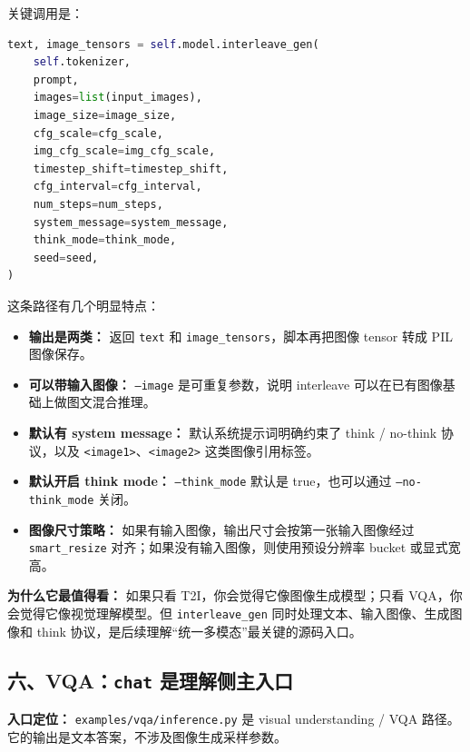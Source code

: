 关键调用是：

\begin{lstlisting}[language=Python]
text, image_tensors = self.model.interleave_gen(
    self.tokenizer,
    prompt,
    images=list(input_images),
    image_size=image_size,
    cfg_scale=cfg_scale,
    img_cfg_scale=img_cfg_scale,
    timestep_shift=timestep_shift,
    cfg_interval=cfg_interval,
    num_steps=num_steps,
    system_message=system_message,
    think_mode=think_mode,
    seed=seed,
)
\end{lstlisting}

这条路径有几个明显特点：

\begin{itemize}[leftmargin=1.5em]
  \item \textbf{输出是两类：} 返回 \texttt{text} 和 \texttt{image\_tensors}，脚本再把图像 tensor 转成 PIL 图像保存。
  \item \textbf{可以带输入图像：} \texttt{--image} 是可重复参数，说明 interleave 可以在已有图像基础上做图文混合推理。
  \item \textbf{默认有 system message：} 默认系统提示词明确约束了 think / no-think 协议，以及 \texttt{<image1>}、\texttt{<image2>} 这类图像引用标签。
  \item \textbf{默认开启 think mode：} \texttt{--think\_mode} 默认是 true，也可以通过 \texttt{--no-think\_mode} 关闭。
  \item \textbf{图像尺寸策略：} 如果有输入图像，输出尺寸会按第一张输入图像经过 \texttt{smart\_resize} 对齐；如果没有输入图像，则使用预设分辨率 bucket 或显式宽高。
\end{itemize}

\begin{intubox}
\textbf{为什么它最值得看：} 如果只看 T2I，你会觉得它像图像生成模型；只看 VQA，你会觉得它像视觉理解模型。但 \texttt{interleave\_gen} 同时处理文本、输入图像、生成图像和 think 协议，是后续理解“统一多模态”最关键的源码入口。
\end{intubox}

\subsection{六、VQA：\texttt{chat} 是理解侧主入口}

\begin{conceptbox}
\textbf{入口定位：} \texttt{examples/vqa/inference.py} 是 visual understanding / VQA 路径。它的输出是文本答案，不涉及图像生成采样参数。
\end{conceptbox}

